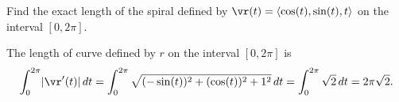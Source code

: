 \begin{activity} \label{A:9.8.2} Find the exact length of the spiral defined by $\vr(t) = \langle \cos(t), \sin(t), t \rangle$ on the interval $[0,2\pi]$. 


\end{activity}
\begin{smallhint}

\end{smallhint}
\begin{bighint}

\end{bighint}
\begin{activitySolution}
The length of curve defined by $r$ on the interval $[0,2 \pi]$ is 
\[\int_0^{2\pi} \lvert \vr'(t) \rvert \, dt = \int_0^{2\pi} \sqrt{(-\sin(t))^2 + (\cos(t))^2 + 1^2} \, dt = \int_0^{2\pi} \sqrt{2} \, dt = 2 \pi \sqrt{2}.\]
\end{activitySolution}
\aftera
